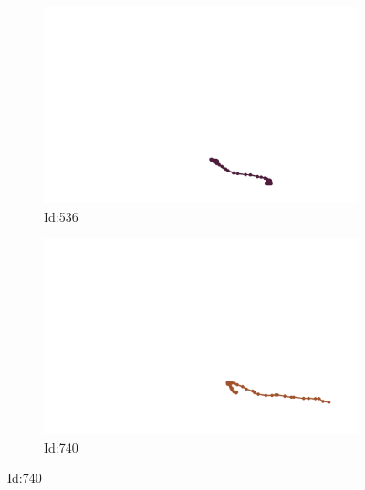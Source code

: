 \documentclass[12pt,twoside]{report}
\begin{document}
\begin{figure}
\centering
\begin{subfigure}[b]{0.20\textwidth}
\centering
\includegraphics[width=\textwidth]{../../trajectories/536.png}
\caption{Id:536}
\end{subfigure}
\begin{subfigure}[b]{0.20\textwidth}
\centering
\includegraphics[width=\textwidth]{../../trajectories/740.png}
\caption{Id:740}
\end{subfigure}
\end{figure}
\end{document}
